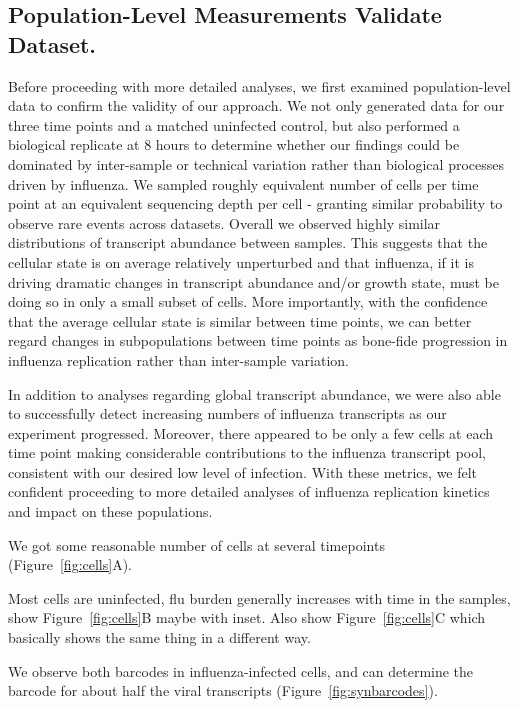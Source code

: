 \documentclass[9pt,lineno]{elife}
\begin{document}
\subsection{Population-Level Measurements Validate Dataset.}
Before proceeding with more detailed analyses, we first examined population-level data to confirm the validity of our approach. We not only generated data for our three time points and a matched uninfected control, but also performed a biological replicate at 8 hours to determine whether our findings could be dominated by inter-sample or technical variation rather than biological processes driven by influenza. We sampled roughly equivalent number of cells per time point at an equivalent sequencing depth per cell - granting similar probability to observe rare events across datasets. Overall we observed highly similar distributions of transcript abundance between samples. This suggests that the cellular state is on average relatively unperturbed and that influenza, if it is driving dramatic changes in transcript abundance and/or growth state, must be doing so in only a small subset of cells. More importantly, with the confidence that the average cellular state is similar between time points, we can better regard changes in subpopulations between time points as bone-fide progression in influenza replication rather than inter-sample variation.

In addition to analyses regarding global transcript abundance, we were also able to successfully detect increasing numbers of influenza transcripts as our experiment progressed. Moreover, there appeared to be only a few cells at each time point making considerable contributions to the influenza transcript pool, consistent with our desired low level of infection. With these metrics, we felt confident proceeding to more detailed analyses of influenza replication kinetics and impact on these populations.

We got some reasonable number of cells at several timepoints (Figure~\ref{fig:cells}A).

Most cells are uninfected, flu burden generally increases with time in the samples, show Figure~\ref{fig:cells}B maybe with inset.
Also show Figure~\ref{fig:cells}C which basically shows the same thing in a different way.

We observe both barcodes in influenza-infected cells, and can determine the barcode for about half the viral transcripts (Figure~\ref{fig:synbarcodes}).
\end{document}
